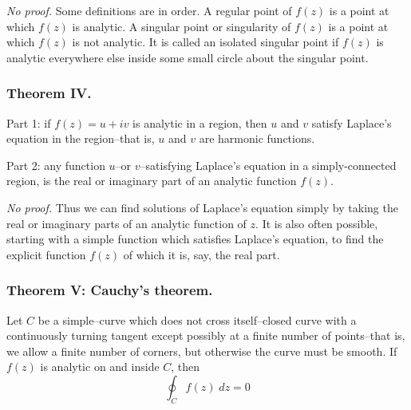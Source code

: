 \documentclass[../../../main.tex]{subfiles}
\begin{document}
\emph{No proof.} Some definitions are in order. A regular point of $f (z)$ is a point at which $f (z)$ is analytic. A singular point or singularity of $f (z)$ is a point at which $f (z)$ is not analytic. It is called an isolated singular point if $f (z)$ is analytic everywhere else inside some small circle about the singular point.

\subsubsection{Theorem IV.} Part 1: if $f(z) = u +iv$ is analytic in a region, then $u$ and $v$ satisfy Laplace's equation in the region--that is, $u$ and $v$ are harmonic functions.

Part 2: any function $u$--or $v$--satisfying Laplace's equation in a simply-connected region, is the real or imaginary part of an analytic function $f(z)$.

\emph{No proof.} Thus we can find solutions of Laplace's equation simply by taking the real or imaginary parts of an analytic function of $z$. It is also often possible, starting with a simple function which satisfies Laplace's equation, to find the explicit function $f (z)$ of which it is, say, the real part.

\subsubsection{Theorem V: Cauchy's theorem.} Let $C$ be a simple--curve which does not cross itself--closed curve with a continuously turning tangent except possibly at a ﬁnite number of points--that is, we allow a ﬁnite number of corners, but otherwise the curve must be smooth. If $f(z)$ is analytic on and inside $C$, then
\begin{equation*}
    \oint_C f(z) \;dz = 0
\end{equation*}
\end{document}
